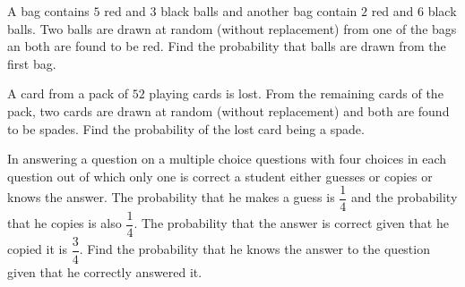 \item A bag contains $5$ red and $3$ black balls and another bag contain $2$ red and $6$ black balls. Two balls are drawn at random (without replacement) from one of the bags an both are found to be red. Find the probability that balls are drawn from the first bag.                 
\item A card from a pack of $52$  playing cards is lost. From the remaining cards of the pack, two cards are drawn at random (without replacement) and both are found to be spades. Find the probability of the lost card being a spade. 
\item In answering a question on a multiple choice questions with four choices in each question out of which only one is correct a student either guesses or copies or knows the answer. The probability that he makes a guess is $\dfrac{1}{4}$ and the probability that he copies is also $\dfrac{1}{4}$. The probability that the answer is correct given that he copied it is $\dfrac{3}{4}$. Find the probability that he knows the answer to the question given that he correctly answered it.

